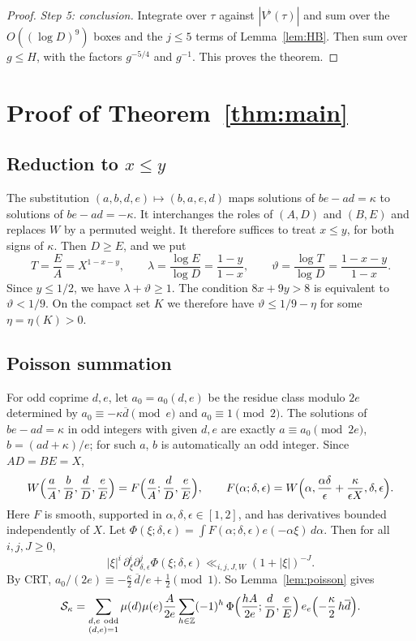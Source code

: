 \documentclass[11pt]{amsart}
\theoremstyle{definition}
\theoremstyle{remark}
\numberwithin{equation}{section}
\newcommand{\Z}{\mathbb Z}
\newcommand{\cS}{\mathcal S}
\newcommand{\inv}[1]{\overline{#1}}
\begin{document}
\begin{proof}
\emph{Step 5: conclusion.}  Integrate over $\tau$ against $|V^\flat(\tau)|$
and sum over the $O((\log D)^9)$ boxes and the $j\le5$ terms of
Lemma~\ref{lem:HB}.  Then sum over $g\le H$, with the factors
$g^{-5/4}$ and $g^{-1}$.  This proves the theorem.
\end{proof}

\section{Proof of Theorem~\ref{thm:main}}\label{sec:proof}

\subsection{Reduction to $x\le y$}
The substitution $(a,b,d,e)\mapsto(b,a,e,d)$ maps solutions of
$be-ad=\kappa$ to solutions of $be-ad=-\kappa$.  It interchanges the roles
of $(A,D)$ and $(B,E)$ and replaces $W$ by a permuted weight.  It therefore
suffices to treat $x\le y$, for both signs of $\kappa$.  Then $D\ge E$, and
we put
\[
 T=\frac EA=X^{1-x-y},\qquad
 \lambda=\frac{\log E}{\log D}=\frac{1-y}{1-x},\qquad
 \vartheta=\frac{\log T}{\log D}=\frac{1-x-y}{1-x}.
\]
Since $y\le1/2$, we have $\lambda+\vartheta\ge1$.  The condition
$8x+9y>8$ is equivalent to $\vartheta<1/9$.  On the compact set $K$ we
therefore have $\vartheta\le1/9-\eta$ for some $\eta=\eta(K)>0$.

\subsection{Poisson summation}
For odd coprime $d,e$, let $a_0=a_0(d,e)$ be the residue class modulo $2e$
determined by $a_0\equiv-\kappa\inv d\pmod e$ and $a_0\equiv1\pmod2$.  The
solutions of $be-ad=\kappa$ in odd integers with given $d,e$ are exactly
$a\equiv a_0\pmod{2e}$, $b=(ad+\kappa)/e$; for such $a$, $b$ is
automatically an odd integer.  Since $AD=BE=X$,
\[
 W\Bigl(\frac aA,\frac bB,\frac dD,\frac eE\Bigr)
 =F\Bigl(\frac aA;\frac dD,\frac eE\Bigr),
 \qquad
 F(\alpha;\delta,\epsilon)=W\Bigl(\alpha,\frac{\alpha\delta}{\epsilon}
 +\frac{\kappa}{\epsilon X},\delta,\epsilon\Bigr).
\]
Here $F$ is smooth, supported in $\alpha,\delta,\epsilon\in[1,2]$, and has
derivatives bounded independently of $X$.  Let
$\Phi(\xi;\delta,\epsilon)=\int F(\alpha;\delta,\epsilon)e(-\alpha\xi)\,d\alpha$.
Then for all $i,j,J\ge0$,
\begin{equation}\label{eq:Phi-decay}
 |\xi|^i\,\partial_\xi^i\partial_{\delta,\epsilon}^{j}
 \Phi(\xi;\delta,\epsilon)\ll_{i,j,J,W}(1+|\xi|)^{-J}.
\end{equation}
By CRT, $a_0/(2e)\equiv-\tfrac\kappa2\,\inv d/e+\tfrac12\pmod1$.  So
Lemma~\ref{lem:poisson} gives
\begin{equation}\label{eq:after-poisson}
 \cS_\kappa=\sum_{\substack{d,e\ \mathrm{odd}\\(d,e)=1}}\mu(d)\mu(e)
 \frac A{2e}\sum_{h\in\Z}(-1)^h\,
 \Phi\Bigl(\frac{hA}{2e};\frac dD,\frac eE\Bigr)\,
 e_e\Bigl(-\frac\kappa2\,h\inv d\Bigr).
\end{equation}
\end{document}
